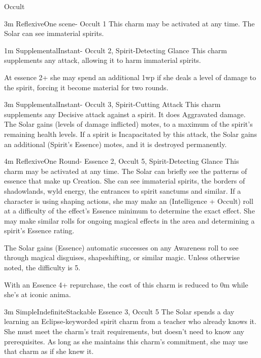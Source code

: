 \begin{Ability}{Occult}

  {3m}
  {Reflexive}{One scene}{-}
  {Occult 1}
  This charm may be activated at any time. The Solar can see immaterial spirits.

  {1m}
  {Supplemental}{Instant}{-}
  {Occult 2, Spirit-Detecting Glance}
  This charm supplements any attack, allowing it to harm immaterial spirits.

  At essence 2+ she may spend an additional 1wp if she deals a level of damage to the spirit, forcing it become material for two rounds.

  {3m}
  {Supplemental}{Instant}{-}
  {Occult 3, Spirit-Cutting Attack}
  This charm supplements any Decisive attack against a spirit. It does Aggravated damage. The Solar gains (levels of damage inflicted) motes, to a maximum of the spirit's remaining health levels. If a spirit is Incapacitated by this attack, the Solar gains an additional (Spirit's Essence) motes, and it is destroyed permanently.

  {4m}
  {Reflexive}{One Round}{-}
  {Essence 2, Occult 5, Spirit-Detecting Glance}
  This charm may be activated at any time. The Solar can briefly see the patterns of essence that make up Creation. She can see immaterial spirits, the borders of shadowlands, wyld energy, the entrances to spirit sanctums and similar. If a character is using shaping actions, she may make an (Intelligence + Occult) roll at a difficulty of the effect's Essence minimum to determine the exact effect. She may make similar rolls for ongoing magical effects in the area and determining a spirit's Essence rating.

  The Solar gains (Essence) automatic successes on any Awareness roll to see through magical disguises, shapeshifting, or similar magic. Unless otherwise noted, the difficulty is 5.

  With an Essence 4+ repurchase, the cost of this charm is reduced to 0m while she's at iconic anima.

  {3m}
  {Simple}{Indefinite}{Stackable}
  {Essence 3, Occult 5}
  The Solar spends a day learning an Eclipse-keyworded spirit charm from a teacher who already knows it. She must meet the charm's trait requirements, but doesn't need to know any prerequisites. As long as she maintains this charm's commitment, she may use that charm as if she knew it.


\end{Ability}

